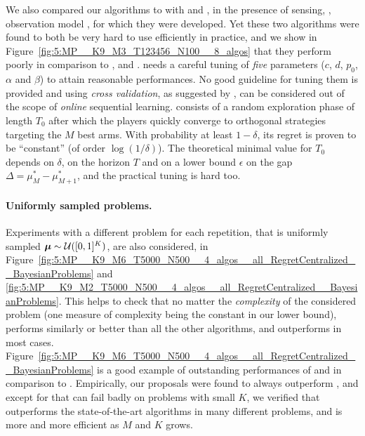 We also compared our algorithms to  %
with \MEGA{} \citep{Avner15} and \MusicalChair{} \citep{Rosenski16}, in the presence of sensing, \ie, observation model \modeldeux, for which they were developed.
Yet these two algorithms were found to both be very hard to use efficiently in practice, and we show in
%
Figure~\ref{fig:5:MP__K9_M3_T123456_N100__8_algos} that they perform poorly in comparison to \rhoRand, \RandTopM{} and \MCTopM.
%
\MEGA{} needs a careful tuning of \emph{five} parameters ($c$, $d$, $p_0$, $\alpha$ and $\beta$) to attain reasonable performances. No good guideline for tuning them is provided and using \emph{cross validation}, as suggested by \cite{Avner15},
can be considered out of the scope of \emph{online} sequential learning.
%
\MusicalChair{} consists of a random exploration phase of length $T_0$ after which the players quickly converge to orthogonal strategies targeting the $M$ best arms. With probability at least $1-\delta$, its regret is proven to be ``constant'' (of order $\log(1/\delta)$). The theoretical minimal value for $T_0$ depends on $\delta$, on the horizon $T$ and on a lower bound $\epsilon$ on the gap $\Delta = \mu^*_M - \mu^*_{M+1}$, and the practical tuning is hard too. %


\paragraph{Uniformly sampled problems.}
%
Experiments with a different problem for each repetition,
that is uniformly sampled $\boldsymbol{\mu} \sim \mathcal{U}([0,1]^K)$,
are also considered, in Figure~\ref{fig:5:MP__K9_M6_T5000_N500__4_algos__all_RegretCentralized__BayesianProblems} and \ref{fig:5:MP__K9_M2_T5000_N500__4_algos__all_RegretCentralized__BayesianProblems}.
This helps to check that no matter the \emph{complexity} of the considered problem (one measure of complexity being the constant in our lower bound),
\MCTopM{} performs similarly or better than all the other algorithms,
and \Selfish{} outperforms \rhoRand{} in most cases.
Figure~\ref{fig:5:MP__K9_M6_T5000_N500__4_algos__all_RegretCentralized__BayesianProblems} is a good example
of outstanding performances of \MCTopM{} and \Selfish{} in comparison to \rhoRand{}.
%
Empirically, our proposals were found to always outperform \rhoRand{}, and except for \Selfish{} that can fail badly on problems with small $K$,
we verified that \MCTopM{} outperforms the state-of-the-art algorithms in many different problems, and is more and more efficient as $M$ and $K$ grows.

